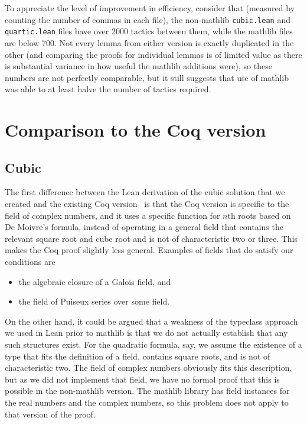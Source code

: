 \documentclass{article} %
\theoremstyle{plain}
\theoremstyle{definition}
\newcommand{\Lean}{\textsf{Lean}\xspace}
\newcommand{\mathlib}{\textsf{mathlib}\xspace}
\begin{document}
To appreciate the level of improvement in efficiency, consider that (measured by counting the number of commas in each file),
the non-mathlib \lstinline!cubic.lean! and \lstinline!quartic.lean! files have over 2000 tactics between them, while the \mathlib files are below 700.
Not every lemma from either version is exactly duplicated in the other
(and comparing the proofs for individual lemmas is of limited value as there is substantial variance in how useful the \mathlib additions were),
so these numbers are not perfectly comparable,
but it still suggests that use of \mathlib was able to at least halve the number of tactics required.

\section {Comparison to the Coq version}
\label{sec:coqcomp}

\subsection{Cubic}
\label{sec:coqcomp:cubic}

The first difference between the \Lean derivation of the cubic solution that we created and the existing Coq version~\cite{coq_proof} is that
the Coq version is specific to the field of complex numbers,
and it uses a specific function for $n$th roots based on De Moivre's formula,
instead of operating in a general field that contains the relevant square root and cube root and is not of characteristic two or three.
This makes the Coq proof slightly less general.
Examples of fields that do satisfy our conditions are
\begin{itemize}
\item the algebraic closure of a Galois field, and
\item the field of Puiseux series over some field.
\end{itemize}
On the other hand, it could be argued that a weakness of the typeclass approach we used in \Lean prior to \mathlib is that
we do not actually establish that any such structures exist.
For the quadratic formula, say, we assume the existence of a type that fits the definition of a field,
contains square roots, and is not of characteristic two.
The field of complex numbers obviously fits this description,
but as we did not implement that field, we have no formal proof that this is possible in the non-mathlib version.
The \mathlib library has field instances for the real numbers and the complex numbers, so this problem does not apply to that version of the proof.
\end{document}
